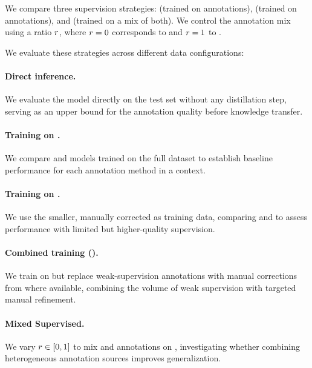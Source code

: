 \begin{table}
    \centering
    \small
    \resizebox{0.8\textwidth}{!}{
        
    }
    \caption{Student models used for each language, referenced by their HuggingFace identifier.}
    \label{tab:models}
\end{table}

We compare three supervision strategies: \weakModel (trained on \dict annotations), \distilmodels (trained on \instruct annotations), and \hybridmodel (trained on a mix of both). We control the annotation mix using a ratio $r$, where $r=0$ corresponds to \weakModel and $r=1$ to \distilmodels.

We evaluate these strategies across different data configurations:

\paragraph{Direct \instruct inference.} We evaluate the \instruct model directly on the \Sgold test set without any distillation step, serving as an upper bound for the annotation quality before knowledge transfer.

\paragraph{Training on \Ssilver.} We compare \weakModel and \distilmodels models trained on the full \Ssilver dataset to establish baseline performance for each annotation method in a \mono context.

\paragraph{Training on \Sval.} We use the smaller, manually corrected \Sval as training data, comparing \weakModel and \distilmodels to assess performance with limited but higher-quality supervision.

\paragraph{Combined training (\Sstar).} We train on \Ssilver but replace weak-supervision annotations with manual corrections from \Sval where available, combining the volume of weak supervision with targeted manual refinement.

\paragraph{Mixed Supervised.} We vary $r \in [0,1]$ to mix \dict and \instruct annotations on \Ssilver, investigating whether combining heterogeneous annotation sources improves generalization.

